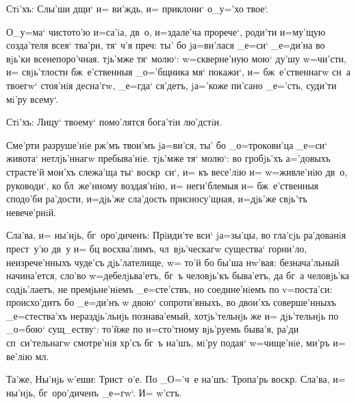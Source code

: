 Стi'хъ: Слы'ши дщи` и= ви'ждь, и= приклони` о_у='хо 
твое`. 

О_у=ма` чистото'ю и=са'iа, дв~о, и=здале'ча прорече`, 
роди'ти и=му'щую созда'теля всея` тва'ри, тя` ч'я 
преч: ты' бо jа=ви'лася _е=си` _е=ди'на во вjь'ки 
всенепоро'чная. тjь'мже тя` молю`: w=скверне'ную мою` 
ду'шу w=чи'сти, и= свjь'тлости бж~е'ственныя _о='бщника 
мя` покажи`, и= бж~е'ственнагw сн~а твоегw` стоя'нiя 
десна'гw, _е=гда` ся'детъ, jа='коже пи'сано _е='сть, 
суди'ти мi'ру всему`.

Стi'хъ: Лицу` твоему` помо'лятся бога'тiи лю'дстiи. 

Сме'рти разруше'нiе рж'мъ твои'мъ jа=ви'ся, ты' 
бо _о=трокови'ца _е=си` живота` нетлjь'ннагw пребыва'нiе. 
тjь'мже тя` молю`: во гробjь'хъ а='довыхъ страсте'й 
мои'хъ слежа'ща ты` воскр~си`, и= къ весе'лiю и= 
w=живле'нiю дв~о, руководи`, ко бл~же'нному воздая'нiю, 
и= неги'блемыя и= бж~е'ственныя сподо'би ра'дости, 
и=дjь'же сла'дость присносу'щная, и=дjь'же свjь'тъ 
невече'рнiй.

Сла'ва, и= ны'нjь, бг~оро'диченъ: Прiиди'те вси` 
jа=зы'цы, во гла'сjь ра'дованiя прест~у'ю дв~у и= бц 
восхва'лимъ, чл~вjь'ческагw существа` горни'ло, 
неизрече'нныхъ чуде'съ дjь'лателище, w= то'й бо бы'ша 
нw'вая: безнача'льный начина'ется, сло'во 
w=дебелjьва'етъ, бг~ъ человjь'къ быва'етъ, да бг~а 
человjь'ка содjь'лаетъ, не премjьне'нiемъ _е=сте'ствъ, но 
соедине'нiемъ по v=поста'си: происхо'дитъ бо _е=ди'нъ w\т 
двою` сопроти'вныхъ, во двои'хъ соверше'нныхъ 
_е=стества'хъ нераздjь'льнjь познава'емый, хотjь'тельнjь 
же и= дjь'тельнjь по _о=бою` сущ_еству`: то'йже по 
и=сто'тному вjь'руемь быва'я, ра'ди сп~си'тельнагw 
смотре'нiя хр'съ бг~ъ на'шъ, мi'ру подая` w=чище'нiе, 
ми'ръ и= ве'лiю мл.

Та'же, Ны'нjь w'еши: Трист~о'е. По _О='ч~е 
на'шъ: Тропа'рь воскр. Сла'ва, и= ны'нjь, 
бг~оро'диченъ _е=гw`. И= w'стъ.
